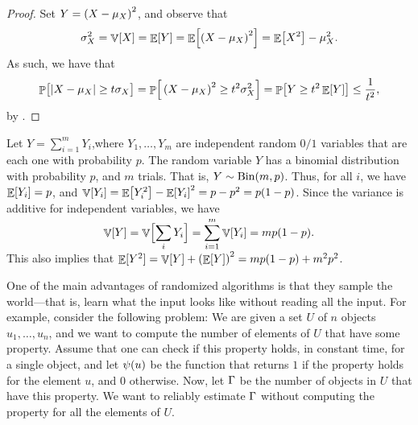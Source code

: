 \begin{proof}
    Set $Y = \pth{X - \mu_X}^2$, and observe that
    \begin{equation*}
        \sigma_X^2
        =%
        \Var{X} =
        \Ex{ Y}
        =%
        \Ex{\pth{X - \mu_X}^2}
        =%
        \Ex{X^2}  - \mu_X^2.
    \end{equation*}
    As such, we have that
    \begin{equation*}
        \Prob{\bigl. \cardin{X - \mu_X}\geq t \sigma_X}%
        =%
        \Prob{\,\pth{X - \mu_X}^2\geq t^2 \sigma_X^2}
        =%
        \Prob{ Y \geq t^2 \Ex{Y}\bigl.\!}
        \leq%
        \frac{1}{t^2},
    \end{equation*}
    by .
\end{proof}

\begin{example}
    Let $Y = \sum_{i=1}^m Y_i$,\hfil\break where $Y_1, \ldots, Y_m$ are
    independent random $0/1$ variables that are each one with probability
    $p$. The random variable $Y$ has a binomial distribution with
    probability $p$, and $m$ trials.  That is, $Y \sim
    \DistBinom{m}{p}$. Thus, for all $i$, we have $\mathop{\mathbb{E}}\!\left[ {Y_i} \right] = p$, and
    $\mathop{\mathbb{V}}\!\left[ {Y_i} \right] = \mathop{\mathbb{E}}\!\left[ {Y_i^2} \right] - \mathop{\mathbb{E}}\!\left[ {Y_i} \right]^2 = p - p^2 = p(1-p)$. Since the
    variance is additive for independent variables, we have
    \begin{equation*}
        \mathop{\mathbb{V}}\!\left[ {Y} \right] = \mathop{\mathbb{V}}\!\left[ {\Bigl. \smash{\sum_i Y_i}} \right] =
        \smash{\sum_{i=1}^m \mathop{\mathbb{V}}\!\left[ {Y_i} \right]} = m p (1-p).
    \end{equation*}
    This also implies that
    $\Ex{\smash{Y^2}} = \Var{Y} + \pth{\Ex{Y}}^2 = m p (1-p) + m^2 p^2$.
\end{example}










One of the main advantages of randomized algorithms is that they sample
the world---that is, learn what the input looks like without reading all
the input. For example, consider the following problem: We are given a
set $U$ of $n$ objects $u_1, \ldots, u_n$, and we want to compute the number
of elements of $U$ that have some property. Assume that one can check if
this property holds, in constant time, for a single object, and let
$\propertyX{u}$ be the function that returns $1$ if the property holds
for the element $u$, and $0$ otherwise.  Now, let $\Gamma$ be the number
of objects in $U$ that have this property. We want to reliably estimate
$\Gamma$ without computing the property for all the elements of $U$.

